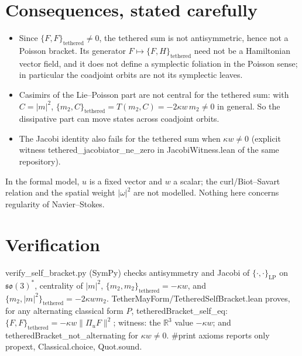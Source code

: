 \documentclass[11pt]{article}
\renewcommand{\texttt}[1]{{\ttfamily\hyphenchar\font=45\relax\textup{#1}}}
\begin{document}
\section{Consequences, stated carefully}
\begin{itemize}
\item Since $\{F,F\}_{\mathrm{tethered}}\neq0$, the tethered sum is not antisymmetric, hence not a Poisson bracket. Its generator $F\mapsto\{F,H\}_{\mathrm{tethered}}$ need not be a Hamiltonian vector field, and it does not define a symplectic foliation in the Poisson sense; in particular the coadjoint orbits are not its symplectic leaves.
\item Casimirs of the Lie--Poisson part are not central for the tethered sum: with $C=|m|^2$, $\{m_2,C\}_{\mathrm{tethered}}=T(m_2,C)=-2\kappa w\,m_2\neq0$ in general. So the dissipative part can move states across coadjoint orbits.
\item The Jacobi identity also fails for the tethered sum when $\kappa w\neq0$ (explicit witness \texttt{tethered\_jacobiator\_ne\_zero} in \texttt{JacobiWitness.lean} of the same repository).
\end{itemize}
\begin{remark}
In the formal model, $u$ is a fixed vector and $w$ a scalar; the curl/Biot--Savart relation and the spatial weight $|\omega|^2$ are not modelled. Nothing here concerns regularity of Navier--Stokes.
\end{remark}

\section{Verification}
\texttt{verify\_self\_bracket.py} (SymPy) checks antisymmetry and Jacobi of $\{\cdot,\cdot\}_{\mathrm{LP}}$ on $\mathfrak{so}(3)^*$, centrality of $|m|^2$, $\{m_2,m_2\}_{\mathrm{tethered}}=-\kappa w$, and $\{m_2,|m|^2\}_{\mathrm{tethered}}=-2\kappa w m_2$.
\texttt{TetherMayForm/TetheredSelfBracket.lean} proves, for any alternating classical form $P$, \texttt{tetheredBracket\_self\_eq}: $\{F,F\}_{\mathrm{tethered}}=-\kappa w\|\Pi_uF\|^2$; \texttt{witness}: the $\mathbb R^3$ value $-\kappa w$; and \texttt{tetheredBracket\_not\_alternating} for $\kappa w\neq0$. \texttt{\#print axioms} reports only \texttt{propext}, \texttt{Classical.choice}, \texttt{Quot.sound}.
\end{document}
